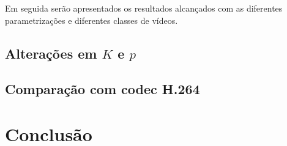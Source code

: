\documentclass[cic,tc]{iiufrgs}
\begin{document}
Em seguida serão apresentados os resultados alcançados com as diferentes parametrizações 
e diferentes classes de vídeos.

\section{Alterações em $K$ e $p$}

\section{Comparação com codec H.264}

\chapter{Conclusão}


% 



\end{document}
